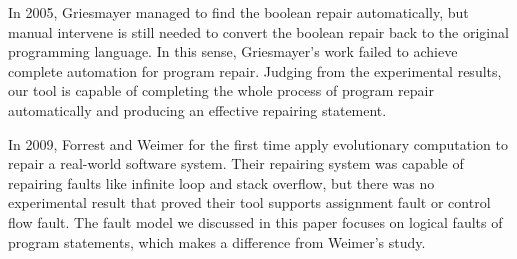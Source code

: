 In 2005, Griesmayer managed to find the boolean repair automatically\cite{RoBPwaAtC}, but manual intervene is still needed to convert the boolean repair back to the original programming language.
In this sense, Griesmayer's work failed to achieve complete automation for program repair.
Judging from the experimental results, our tool is capable of completing the whole process of program repair automatically and producing an effective repairing statement.

In 2009,  Forrest and Weimer for the first time apply evolutionary computation to repair a real-world software system\cite{AFPUGP}. Their repairing system was capable of repairing faults like
infinite loop and stack overflow, but there was no experimental result that proved their tool supports assignment fault or control flow fault.
The fault model we discussed in this paper focuses on logical faults of program statements, which makes a difference from Weimer's study.
